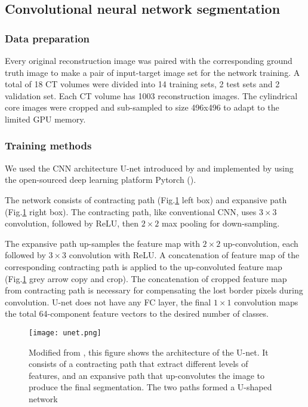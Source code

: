 \documentclass[draft,linenumbers]{agujournal2018}
\begin{document}
\subsection{Convolutional neural network segmentation}
\subsubsection{Data preparation}
Every original reconstruction image was paired with the corresponding ground truth image to make a pair of input-target image set for the network training. A total of 18 CT volumes were divided into 14 training sets, 2 test sets and 2 validation set. Each CT volume has 1003 reconstruction images. The cylindrical core images were cropped and sub-sampled to size 496x496 to adapt to the limited GPU memory.

\subsubsection{Training methods}
We used the CNN architecture U-net introduced by \citet{ronneberger2015u} and implemented by \citet{Jorispytorch} using the open-sourced deep learning platform Pytorch (\citet{paszke2017automatic}). 

The network consists of contracting path (Fig.\ref{unet} left box) and expansive path (Fig.\ref{unet} right box). The contracting path, like conventional CNN, uses $3\times3$ convolution, followed by ReLU, then $2\times2$ max pooling for down-sampling. 

The expansive path up-samples the feature map with $2\times2$ up-convolution, each followed by $3\times3$ convolution with ReLU. A concatenation of feature map of the corresponding contracting path is applied to the up-convoluted feature map (Fig.\ref{unet} grey arrow copy and crop). The concatenation of cropped feature map from contracting path is necessary for compensating the lost border pixels during convolution. U-net does not have any FC layer, the final $1\times1$ convolution maps the total 64-component feature vectors to the desired number of classes. 

\begin{figure}[h]
\centering
\texttt{[image: unet.png]}
\caption{Modified from \citet{ronneberger2015u}, this figure shows the architecture of the U-net. It consists of a contracting path that  extract different levels of features, and an expansive path that up-convolutes the image to produce the final segmentation. The two paths formed a U-shaped network}
\label{unet}
\end{figure}
\end{document}
